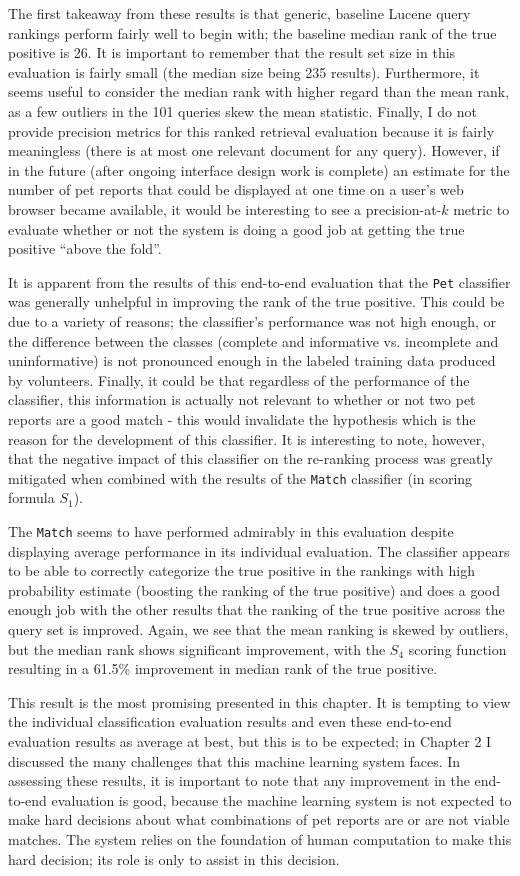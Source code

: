 The first takeaway from these results is that generic, baseline Lucene query rankings perform fairly well to begin with; the baseline median rank of the true positive is 26.  It is important to remember that the result set size in this evaluation is fairly small (the median size being 235 results).  Furthermore, it seems useful to consider the median rank with higher regard than the mean rank, as a few outliers in the 101 queries skew the mean statistic.  Finally, I do not provide precision metrics for this ranked retrieval evaluation because it is fairly meaningless (there is at most one relevant document for any query).  However, if in the future (after ongoing interface design work is complete) an estimate for the number of pet reports that could be displayed at one time on a user's web browser became available, it would be interesting to see a precision-at-$k$ metric to evaluate whether or not the system is doing a good job at getting the true positive ``above the fold''.

It is apparent from the results of this end-to-end evaluation that the {\tt Pet} classifier was generally unhelpful in improving the rank of the true positive.  This could be due to a variety of reasons; the classifier's performance was not high enough, or the difference between the classes (complete and informative vs. incomplete and uninformative) is not pronounced enough in the labeled training data produced by volunteers.  Finally, it could be that regardless of the performance of the classifier, this information is actually not relevant to whether or not two pet reports are a good match - this would invalidate the hypothesis which is the reason for the development of this classifier.  It is interesting to note, however, that the negative impact of this classifier on the re-ranking process was greatly mitigated when combined with the results of the {\tt Match} classifier (in scoring formula $S_1$).

The {\tt Match} seems to have performed admirably in this evaluation despite displaying average performance in its individual evaluation.  The classifier appears to be able to correctly categorize the true positive in the rankings with high probability estimate (boosting the ranking of the true positive) and does a good enough job with the other results that the ranking of the true positive across the query set is improved.  Again, we see that the mean ranking is skewed by outliers, but the median rank shows significant improvement, with the $S_4$ scoring function resulting in a 61.5\% improvement in median rank of the true positive.

This result is the most promising presented in this chapter.  It is tempting to view the individual classification evaluation results and even these end-to-end evaluation results as average at best, but this is to be expected; in Chapter 2 I discussed the many challenges that this machine learning system faces.  In assessing these results, it is important to note that any improvement in the end-to-end evaluation is good, because the machine learning system is not expected to make hard decisions about what combinations of pet reports are or are not viable matches.  The system relies on the foundation of human computation to make this hard decision; its role is only to assist in this decision.